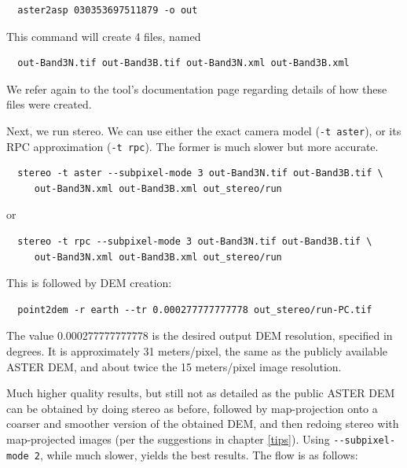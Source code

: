 \begin{verbatim}
  aster2asp 030353697511879 -o out
\end{verbatim}

This command will create 4 files, named

\begin{verbatim}
  out-Band3N.tif out-Band3B.tif out-Band3N.xml out-Band3B.xml
\end{verbatim}

We refer again to the tool's documentation page
regarding details of how these files were created.

Next, we run stereo. We can use either the exact camera model
(\texttt{-t aster}), or its RPC approximation (\texttt{-t rpc}). The
former is much slower but more accurate. 
\begin{verbatim}
  stereo -t aster --subpixel-mode 3 out-Band3N.tif out-Band3B.tif \
     out-Band3N.xml out-Band3B.xml out_stereo/run
\end{verbatim}
or 
\begin{verbatim}
  stereo -t rpc --subpixel-mode 3 out-Band3N.tif out-Band3B.tif \
     out-Band3N.xml out-Band3B.xml out_stereo/run
\end{verbatim}

This is followed by DEM creation:
\begin{verbatim}
  point2dem -r earth --tr 0.000277777777778 out_stereo/run-PC.tif
\end{verbatim}

The value 0.000277777777778 is the desired output DEM resolution, specified in
degrees. It is approximately 31 meters/pixel, the same as the publicly available ASTER DEM,
and about twice the 15 meters/pixel image resolution.

Much higher quality results, but still not as detailed as the public ASTER DEM
can be obtained by doing stereo as before, followed by map-projection onto a coarser and smoother
version of the obtained DEM, and then redoing stereo with map-projected images
(per the suggestions in chapter \ref{tips}).
Using \texttt{-\/-subpixel-mode 2}, while much slower, yields the best results.
The flow is as follows:

